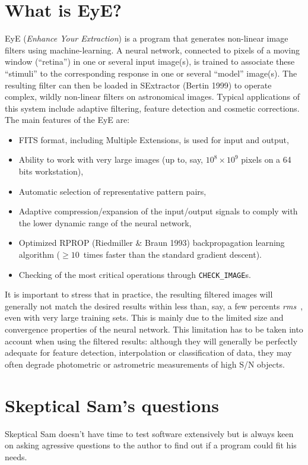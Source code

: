 \documentclass[11pt,titlepage]{article}
\def \rms {{\it rms}\ }
\begin{document}
\section{What is {\sc EyE}?}
{\sc EyE} ({\em Enhance Your Extraction}) is a program that generates non-linear image filters using machine-learning.
A neural network, connected to pixels of a moving window (``retina'') in one or several input image(s), is trained to associate
these ``stimuli'' to the corresponding response in one or several ``model'' image(s). The resulting filter can then be loaded in
SExtractor (Bertin 1999) to operate complex, wildly non-linear filters on astronomical images. Typical applications of
this system include adaptive filtering, feature detection and cosmetic corrections. The main features of the {\sc EyE} are:
\begin{itemize}
\item FITS format, including Multiple Extensions, is used for input and output,
\item Ability to work with very large images (up to, say, $10^8 \times 10^9$ pixels on a 64 bits workstation),
\item Automatic selection of representative pattern pairs,
\item Adaptive compression/expansion of the input/output signals to comply with the lower dynamic range of the neural network,
\item Optimized RPROP (Riedmiller \& Braun 1993) backpropagation learning algorithm ($\ge 10$~times faster than the standard gradient descent).
\item Checking of the most critical operations through {\tt CHECK\_IMAGE}s.
\end{itemize}

It is important to stress that in practice, the resulting filtered images will generally not match the desired results
within less than, say, a few percents \rms, even with very large training sets. This is mainly due to the limited
size and convergence properties of the neural network. This limitation has to be taken into account when using the filtered
results: although they will generally be perfectly adequate for feature detection, interpolation or classification of data,
they may often degrade photometric or astrometric measurements of high S/N objects.

\section{Skeptical Sam's questions}
Skeptical Sam doesn't have time to test software extensively but is always keen on asking agressive questions to the author
to find out if a program could fit his needs.
\end{document}
